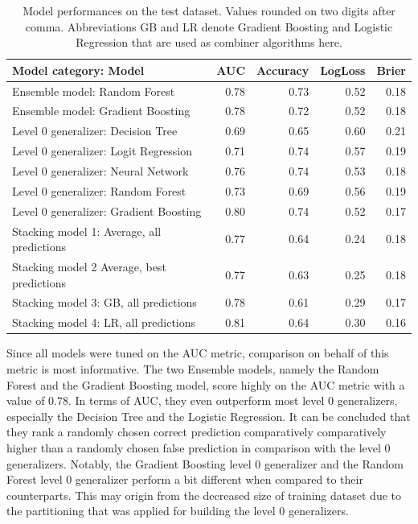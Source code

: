 \documentclass[12pt]{article}
\begin{document}
\begin{table}[ht]
\centering
\begin{tabular}{lrrrr}
  \hline
 Model category: Model & AUC & Accuracy & LogLoss & Brier\\ 
  \hline
Ensemble model: Random Forest & 0.78 & 0.73 & 0.52 & 0.18 \\ 
Ensemble model: Gradient Boosting & 0.78 & 0.72 & 0.52 & 0.18 \\
\hline 
  Level 0 generalizer: Decision Tree & 0.69 & 0.65 & 0.60 & 0.21 \\ 
  Level 0 generalizer: Logit Regression & 0.71 & 0.74 & 0.57 & 0.19 \\ 
  Level 0 generalizer: Neural Network & 0.76 & 0.74 & 0.53 & 0.18 \\ 
  Level 0 generalizer: Random Forest & 0.73 & 0.69 & 0.56 & 0.19 \\ 
  Level 0 generalizer: Gradient Boosting & 0.80 & 0.74 & 0.52 & 0.17 \\ 
\hline
  Stacking model 1: Average, all predictions & 0.77 & 0.64 & 0.24 & 0.18 \\ 
  Stacking model 2 Average, best predictions & 0.77 & 0.63 & 0.25 & 0.18 \\ 
  Stacking model 3: GB, all predictions & 0.78 & 0.61 & 0.29 & 0.17 \\ 
  Stacking model 4: LR, all predictions & 0.81 & 0.64 & 0.30 & 0.16 \\ 
   \hline
\end{tabular}
\caption[Model Performances on the Test Dataset]{Model performances on the test dataset. Values rounded on two digits after comma. Abbreviations GB and LR denote Gradient Boosting and Logistic Regression that are used as combiner algorithms here.}\label{eval}
\end{table}

\noindent Since all models were tuned on the AUC metric, comparison on behalf of this metric is most informative. The two Ensemble models, namely the Random Forest and the Gradient Boosting model, score highly on the AUC metric with a value of $0.78$. In terms of AUC, they even outperform most level 0 generalizers, especially the Decision Tree and the Logistic Regression. It can be concluded that they rank a randomly chosen correct prediction comparatively comparatively higher than a randomly chosen false prediction in comparison with the level 0 generalizers. Notably, the Gradient Boosting level 0 generalizer and the Random Forest level 0 generalizer perform a bit different when compared to their counterparts. This may origin from the decreased size of training dataset due to the partitioning that was applied for building the level 0 generalizers. 
\end{document}

